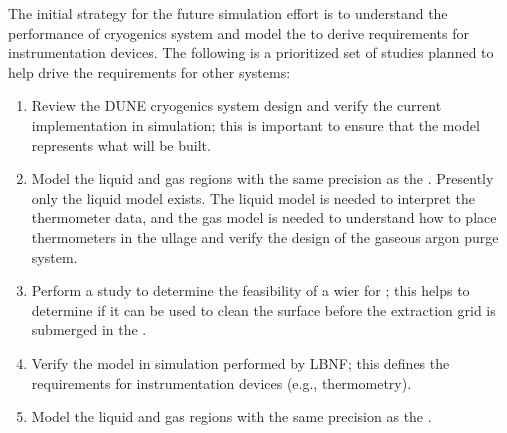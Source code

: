 The initial strategy for the future  simulation effort is to understand the performance of  cryogenics system and model the  to derive requirements for instrumentation devices.
The following is a prioritized set of studies planned to help drive the requirements for other systems:
\begin{enumerate}
\item Review the DUNE  cryogenics system design and verify the current implementation in simulation; this is important to ensure that the model represents what will be built.
\item Model the   liquid and gas regions with the same precision as the . Presently only the liquid model exists. The liquid model is needed to interpret the thermometer data, and the gas model is needed to understand how to place thermometers in the ullage and verify the design of the gaseous argon purge system.
\item Perform a  study to determine the feasibility of a wier for \dual; this helps to determine if it can be used to clean the \lar surface before the extraction grid is submerged in the .
\item Verify the  \single {} model in simulation performed by LBNF; this defines the requirements for instrumentation devices (e.g., thermometry).
\item Model the  liquid and gas regions with the same precision as the . 
\end{enumerate}

